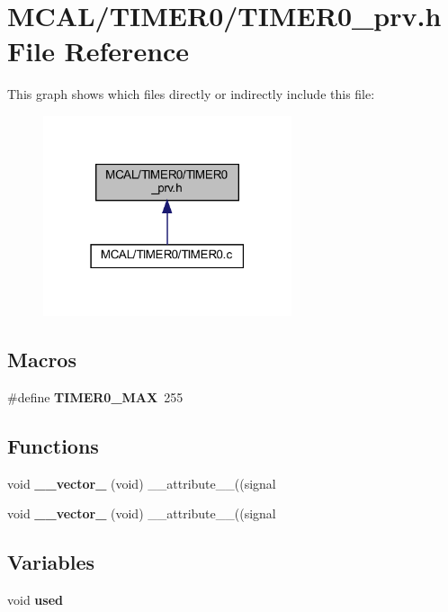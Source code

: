 \section{M\+C\+A\+L/\+T\+I\+M\+E\+R0/\+T\+I\+M\+E\+R0\+\_\+prv.h File Reference}
\label{_t_i_m_e_r0__prv_8h}
This graph shows which files directly or indirectly include this file\+:
\nopagebreak
\begin{figure}[H]
\begin{center}
\leavevmode
\includegraphics[width=207pt]{_t_i_m_e_r0__prv_8h__dep__incl}
\end{center}
\end{figure}
\subsection*{Macros}
\begin{DoxyCompactItemize}
\item 
\#define \textbf{ T\+I\+M\+E\+R0\+\_\+\+M\+AX}~255
\end{DoxyCompactItemize}
\subsection*{Functions}
\begin{DoxyCompactItemize}
\item 
void \textbf{ \+\_\+\+\_\+vector\+\_} (void) \+\_\+\+\_\+attribute\+\_\+\+\_\+((signal
\item 
void \textbf{ \+\_\+\+\_\+vector\+\_} (void) \+\_\+\+\_\+attribute\+\_\+\+\_\+((signal
\end{DoxyCompactItemize}
\subsection*{Variables}
\begin{DoxyCompactItemize}
\item 
void \textbf{ used}
\end{DoxyCompactItemize}


